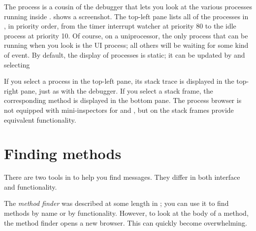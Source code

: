 \documentclass[a4paper,10pt,twoside]{book}
\begin{document}
The process  is a cousin of the debugger that lets you look at the various processes running inside \pharo.
 shows a screenshot.
The top-left pane lists all of the processes in \pharo, in priority order, from the timer interrupt watcher at priority 80 to the idle process at priority 10.
Of course, on a uniprocessor, the only process that can be running when you look is the UI process; all others will be waiting for some kind of event.
By default, the display of processes is static; it can be updated by  and selecting 

If you select a process in the top-left pane, its stack trace is displayed in the top-right pane, just as with the debugger.
If you select a stack frame, the corresponding method is displayed in the bottom pane.
The process browser is not equipped with mini-inspectors for \self and , but  on the stack frames provide equivalent functionality.

\section{Finding methods}

There are two tools in \pharo to help you find messages.
They differ in both interface and functionality.

The \emph{method finder} was described at some length in ; you can use it to find methods by name or by functionality. 
However, to look at the body of a method, the method finder opens a new browser.
This can quickly become overwhelming.
\end{document}
